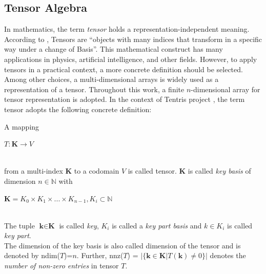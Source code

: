 \subsection{Tensor Algebra}
\label{sec:tensor_algebra}
In mathematics, the term \textit{tensor} holds a representation-independent meaning. According to \cite{rent}, Tensors are “objects with many indices that transform in a specific way under a change of
Basis”. This mathematical construct has many applications in physics, artificial intelligence, and other fields. However, to apply tensors in a practical context, a more concrete definition should be selected. Among other choices, a multi-dimensional arrays is widely used as a representation of a tensor. Throughout this work, a finite $n$-dimensional array for tensor representation is adopted.
In the context of Tentris project \cite{tentris2020}, the term tensor adopts the following concrete definition:

\begin{definition}[Tensor]
A mapping\\
\centerline{$T: \textbf{K} \to V$}\\
from a multi-index $\textbf{K}$ to a codomain $V$ is called tensor. $\textbf{K}$ is called \textit{key basis} of dimension $n \in \mathbb{N}$ with \\
\centerline{ $\textbf{K} = K_0 \times K_1 \times ... \times K_{n-1}, K_i \subset \mathbb{N}$ } \\
The tuple $\textbf{k} \in \textbf{K}$ is called \textit{key}, $K_i$ is called a \textit{key part basis} and $k \in K_i$ is called \textit{key part}.\\
The dimension of the key basis is also called dimension of the tensor and is denoted by ndim($T$)=$n$. Further, nnz($T$) = $|\{\textbf{k} \in \textbf{K} | T(\textbf{k})  \neq 0\}|$ denotes the \textit{ number of non-zero entries} in tensor $T$.
\end{definition} 


